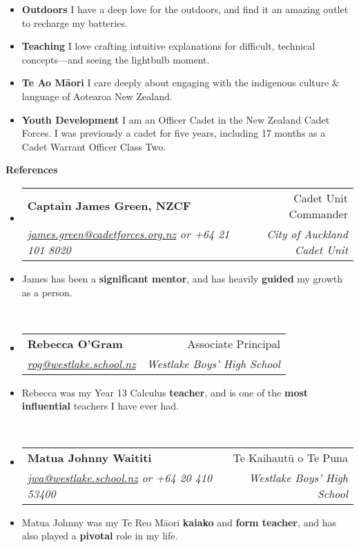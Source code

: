 \documentclass[11pt,a4paper]{article}[leftmargin=*]
\makeatletter
\def \entryspacing {-0pt}
\renewcommand{\section}[2]{\vspace{5pt}
  \colorbox{secondary}{\color{white}\raggedbottom\normalsize\textbf{{#1}{\hspace{7pt}#2}}}
}
\newcommand{\resumeEntryStart}{\begin{itemize}[leftmargin=2.5mm]}
\newcommand{\resumeEntryEnd}{\end{itemize}\vspace{\entryspacing}}
\newcommand{\resumeEntryTSDL}[4]{
  \vspace{-1pt}\item[]
    \begin{tabularx}{0.97\textwidth}{X@{\hspace{60pt}}r}
      \textbf{\color{primary}#1} & {\firabook\color{accent}\small#2} \\
      \textit{\color{accent}\small#3} & \textit{\color{accent}\small#4} \\
    \end{tabularx}\vspace{-6pt}
}
\newcommand{\resumeEntryS}[2]{
  \item[]\small{
    \textbf{\color{primary}#1 }{ #2 \vspace{-4pt}}
  }
}
\newcommand{\resumeEntryP}[1]{
  \item[]\small{
    #1 \vspace{-6pt}
  }\\
}
\newcommand{\resumeBf}[1]{\small\textbf{\color{halfbold}#1}}
\makeatother
\begin{document}
\resumeEntryStart
\resumeEntryS
{Outdoors}
{
  I have a deep love for the outdoors, and find it an amazing outlet to recharge my batteries.
}

\resumeEntryS
{Teaching}
{
  I love crafting intuitive explanations for difficult, technical concepts---and seeing the lightbulb moment.
}

\resumeEntryS
{Te Ao Māori}
{
  I care deeply about engaging with the indigenous culture \& language of Aotearoa New Zealand.
}

\resumeEntryS
{Youth Development}
{
  I am an Officer Cadet in the New Zealand Cadet Forces. I was previously a cadet for five years, including 17 months as a Cadet Warrant Officer Class Two.
}
\resumeEntryEnd

\pagebreak


\section{\faUserCheck}{References}

\resumeEntryStart
\resumeEntryTSDL
{Captain James Green, NZCF}{Cadet Unit Commander}
{\href{mailto:james.green@cadetforces.org.nz}{james.green@cadetforces.org.nz} or +64 21 101 8020}{City of Auckland Cadet Unit}

\resumeEntryP{
  James has been a \resumeBf{significant mentor}, and has heavily \resumeBf{guided} my growth as a person.
}
\resumeEntryEnd

\resumeEntryStart
\resumeEntryTSDL
{Rebecca O'Gram}{Associate Principal}
{\href{mailto:rog@westlake.school.nz}{rog@westlake.school.nz}}{Westlake Boys' High School}

\resumeEntryP{
  Rebecca was my Year 13 Calculus \resumeBf{teacher}, and is one of the \resumeBf{most influential} teachers I have ever had.
}
\resumeEntryEnd

\resumeEntryStart
\resumeEntryTSDL
{Matua Johnny Waititi}{Te Kaihautū o Te Puna}
{\href{mailto:jwa@westlake.school.nz}{jwa@westlake.school.nz} or +64 20 410 53400}{Westlake Boys' High School}

\resumeEntryP{
  Matua Johnny was my Te Reo Māori \resumeBf{kaiako} and \resumeBf{form teacher}, and has also played a \resumeBf{pivotal} role in my life.
}
\resumeEntryEnd
\end{document}
